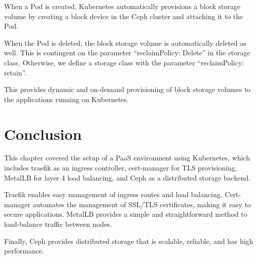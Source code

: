 When a Pod is created, Kubernetes automatically provisions a block storage volume by creating a block device in the Ceph cluster and attaching it to the Pod. 

When the Pod is deleted, the block storage volume is automatically deleted as well. This is contingent on the parameter “reclaimPolicy: Delete” in the storage class. Otherwise, we define a storage class with the parameter “reclaimPolicy: retain”. 

This provides dynamic and on-demand provisioning of block storage volumes to the applications running on Kubernetes. 

\section*{Conclusion}

This chapter covered the setup of a PaaS environment using Kubernetes, which includes traefik as an ingress controller, cert-manager for TLS provisioning, MetalLB for layer 4 load balancing, and Ceph as a distributed storage backend. 

Traefik enables easy management of ingress routes and load balancing. Cert-manager automates the management of SSL/TLS certificates, making it easy to secure applications. MetalLB provides a simple and straightforward method to load-balance traffic between nodes. 

Finally, Ceph provides distributed storage that is scalable, reliable, and has high performance. 